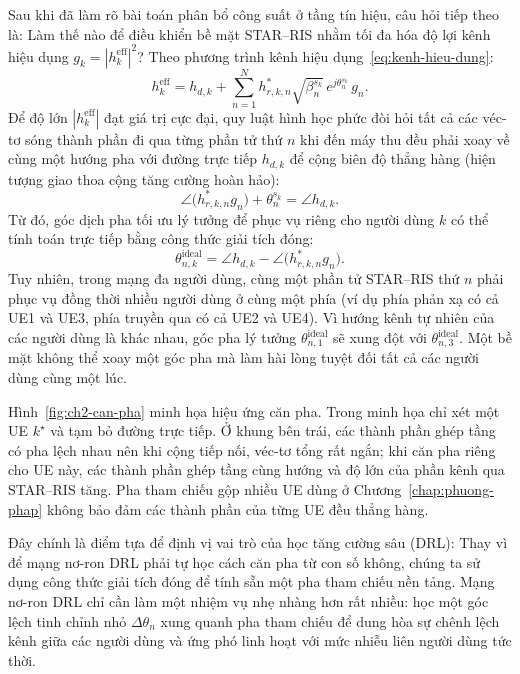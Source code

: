 Sau khi đã làm rõ bài toán phân bổ công suất ở tầng tín hiệu, câu hỏi tiếp theo là: Làm thế nào để điều khiển
bề mặt STAR--RIS nhằm tối đa hóa độ lợi kênh hiệu dụng $g_k = |h^{\mathrm{eff}}_k|^2$? Theo phương trình kênh
hiệu dụng~\eqref{eq:kenh-hieu-dung}:
\begin{equation}
h^{\mathrm{eff}}_k = h_{d,k} + \sum_{n=1}^{N} h^{*}_{r,k,n} \sqrt{\beta^{s_k}_n}\, e^{j\theta^{s_k}_n}\, g_n .
\label{eq:kenh-hieu-dung-khai-trien}
\end{equation}
Để độ lớn $|h^{\mathrm{eff}}_k|$ đạt giá trị cực đại, quy luật hình học phức đòi hỏi tất cả các véc-tơ sóng
thành phần đi qua từng phần tử thứ $n$ khi đến máy thu đều phải xoay về cùng một hướng pha với đường trực tiếp
$h_{d,k}$ để cộng biên độ thẳng hàng (hiện tượng giao thoa cộng tăng cường hoàn hảo):
\begin{equation}
\angle\big(h^{*}_{r,k,n} g_n\big) + \theta^{s_k}_n = \angle h_{d,k} .
\label{eq:dieu-kien-can-pha}
\end{equation}
Từ đó, góc dịch pha tối ưu lý tưởng để phục vụ riêng cho người dùng $k$ có thể tính toán trực tiếp bằng công
thức giải tích đóng:
\begin{equation}
\theta^{\mathrm{ideal}}_{n,k} = \angle h_{d,k} - \angle\big(h^{*}_{r,k,n} g_n\big).
\label{eq:pha-ly-tuong}
\end{equation}
Tuy nhiên, trong mạng đa người dùng, cùng một phần tử STAR--RIS thứ $n$ phải phục vụ đồng thời nhiều người
dùng ở cùng một phía (ví dụ phía phản xạ có cả UE1 và UE3, phía truyền qua có cả UE2 và UE4). Vì hướng kênh tự
nhiên của các người dùng là khác nhau, góc pha lý tưởng $\theta^{\mathrm{ideal}}_{n,1}$ sẽ xung đột với
$\theta^{\mathrm{ideal}}_{n,3}$. Một bề mặt không thể xoay một góc pha mà làm hài lòng tuyệt đối tất cả các
người dùng cùng một lúc.

Hình~\ref{fig:ch2-can-pha} minh họa hiệu ứng căn pha. Trong minh họa chỉ xét một UE $k^\star$ và tạm bỏ đường
trực tiếp. Ở khung bên trái, các thành phần ghép tầng có pha lệch nhau nên khi cộng tiếp nối, véc-tơ tổng rất
ngắn; khi căn pha riêng cho UE này, các thành phần ghép tầng cùng hướng và độ lớn của phần kênh qua STAR--RIS
tăng. Pha tham chiếu gộp nhiều UE dùng ở Chương~\ref{chap:phuong-phap} không bảo đảm các thành phần của từng
UE đều thẳng hàng.



Đây chính là điểm tựa để định vị vai trò của học tăng cường sâu (DRL): Thay vì để mạng nơ-ron DRL phải tự học
cách căn pha từ con số không, chúng ta sử dụng công thức giải tích đóng để tính sẵn một pha tham chiếu nền
tảng. Mạng nơ-ron DRL chỉ cần làm một nhiệm vụ nhẹ nhàng hơn rất nhiều: học một góc lệch tinh chỉnh nhỏ
$\Delta\theta_n$ xung quanh pha tham chiếu để dung hòa sự chênh lệch kênh giữa các người dùng và ứng phó linh
hoạt với mức nhiễu liên người dùng tức thời.

